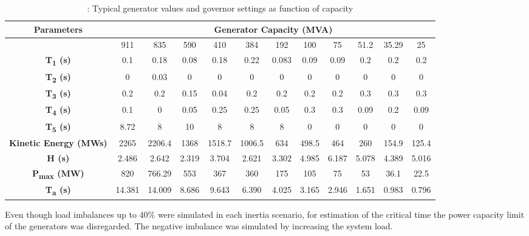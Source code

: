 \begin{table}[h]
	\caption{\label{tb:timeconstant}: Typical generator values and governor settings as function of capacity \cite{Anderson.2002}}
	\begin{adjustbox}{width=\textwidth, center}
		
	\begin{tabular}{cccccccccccc}
		\toprule
		\textbf{Parameters}	& \multicolumn{11}{c}{\textbf{Generator Capacity (MVA)}} \\
		
		\midrule
		{} & 911&	835&	590&	410&	384&	192&	100&	75&	51.2&	35.29&	25 \\
		\midrule

		\textbf{T\textsubscript{1} (s)}&	0.1&	0.18&	0.08&	0.18&	0.22&	0.083&	0.09&	0.09&	0.2&	0.2&	0.2\\
		\textbf{T\textsubscript{2} (s)}&	0&	0.03&	0&	0&	0&	0&	0&	0&	0&	0&	0\\
		\textbf{T\textsubscript{3} (s)}&	0.2&	0.2&	0.15&	0.04&	0.2&	0.2&	0.2&	0.2&	0.3&	0.3&	0.3\\
		\textbf{T\textsubscript{4} (s)}&	0.1&	0&	0.05&	0.25&	0.25&	0.05&	0.3&	0.3&	0.09&	0.2&	0.09\\
		\textbf{T\textsubscript{5} (s)}&	8.72&	8&	10&	8&	8&	8&	0&	0&	0&	0&	0\\
		\textbf{Kinetic Energy (MWs)}&	2265&	2206.4&	1368&	1518.7&	1006.5&	634	&498.5&	464&	260&	154.9&	125.4\\
		\textbf{H (s)}&	2.486&	2.642&	2.319&	3.704&	2.621&	3.302&	4.985&	6.187&	5.078&	4.389&	5.016\\
		\textbf{P\textsubscript{max} (MW)}&	820&	766.29&	553&	367&	360&	175&	105&	75&	53&	36.1&	22.5\\
		\textbf{T\textsubscript{a}  (s)}&	14.381&	14.009&	8.686&	9.643&	6.390&	4.025&	3.165&	2.946&	1.651&	0.983&	0.796\\
		\bottomrule
	\end{tabular}
	\end{adjustbox}
\end{table}






Even though load imbalances up to 40\% were simulated in each inertia scenario, for estimation of the critical time the power capacity limit of the generators was disregarded. The negative imbalance was simulated by increasing the system load. 

